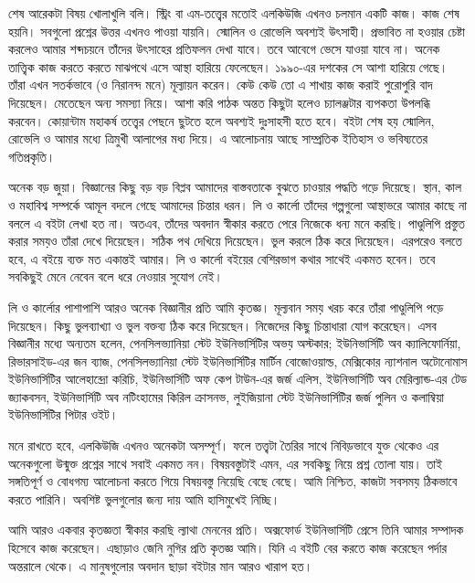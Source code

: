 \documentclass[
  letterpaper,
  DIV=11,
  numbers=noendperiod]{scrreprt}
\begin{document}
শেষ আরেকটা বিষয় খোলাখুলি বলি। স্ট্রিং বা এম-তত্ত্বের মতোই এলকিউজি এখনও চলমান
একটি কাজ। কাজ শেষ হয়নি। সবগুলো প্রশ্নের উত্তর এখনও পাওয়া যায়নি। স্মোলিন ও
রোভেলি অবশ্যই উৎসাহী। প্রভাবিত না হওয়ার চেষ্টা করলেও আমার শব্দচয়নে তাঁদের
উৎসাহের প্রতিফলন দেখা যাবে। তবে আবেগে ভেসে যাওয়া যাবে না। অনেক তাত্ত্বিক
কাজ করতে করতে মাঝপথে এসে আস্থা হারিয়ে ফেলেছেন। ১৯৯০-এর দশকের সে আশা
হারিয়ে গেছে। তাঁরা এখন সতর্কভাবে (ও নিরানন্দ মনে) মূল্যায়ন করেন। কেউ কেউ তো এ
শাখায় কাজ করাই পুরোপুরি বাদ দিয়েছেন। মেতেছেন অন্য সমস্যা নিয়ে। আশা করি পাঠক
অন্তত কিছুটা হলেও চ্যালঞ্জটার ব্যপকতা উপলব্ধি করবেন। কোয়ান্টাম মহাকর্ষ তত্ত্বের
পেছনে ছুটতে হলে অবশ্যই দুঃসাহসী হতে হবে। বইটা শেষ হয় স্মোলিন, রোভেলি ও আমার
মধ্যে ত্রিমুখী আলাপের মধ্য দিয়ে। এ আলোচনায় আছে সাম্প্রতিক ইতিহাস ও ভবিষ্যতের
গতিপ্রকৃতি।

অনেক বড় জুয়া। বিজ্ঞানের কিছু বড় বড় বিপ্লব আমাদের বাস্তবতাকে বুঝতে চাওয়ার পদ্ধতি
গড়ে দিয়েছে। স্থান, কাল ও মহাবিশ্ব সম্পর্কে আমূল বদলে গেছে আমাদের চিন্তার ধরন।
লি ও কার্লো তাঁদের গল্পগুলো আস্থাভরে আমার কাছে না বললে এ বইটা লেখা হত না।
অতএব, তাঁদের অবদান স্বীকার করতে পেরে নিজেকে ধন্য মনে করছি। পাণ্ডুলিপি প্রস্তুত
করার সময়ও তাঁরা দেখে দিয়েছেন। সঠিক পথ দেখিয়ে দিয়েছেন। ভুল করলে ঠিক করে
দিয়েছেন। এরপরেও বলতে হবে, এ বইয়ে ব্যক্ত মত একান্তই আমার। লি ও কার্লো বইয়ের
বেশিরভাগ কথার সাথেই একমত হবেন। তবে সবকিছুই মেনে নেবেন বলে ধরে নেওয়ার সুযোগ
নেই।

লি ও কার্লোর পাশাপাশি আরও অনেক বিজ্ঞানীর প্রতি আমি কৃতজ্ঞ। মূল্যবান সময় খরচ করে
তাঁরা পাণ্ডুলিপি পড়ে দিয়েছেন। কিছু ভুলব্যাখ্যা ও ভুল বক্তব্য ঠিক করে দিয়েছেন।
নিজেদের কিছু চিন্তাধারা যোগ করেছেন। এসব বিজ্ঞানীর মধ্যে অন্যতম হলেন,
পেনসিলভ্যানিয়া স্টেট ইউনিভার্সিটির অভয় অস্টকার; ইউনিভার্সিটি অব ক্যালিফোর্নিয়া,
রিভারসাইড-এর জন ব্যাজ, পেনসিলভ্যানিয়া স্টেট ইউনিভার্সিটির মার্টিন বোজোওয়াল্ড,
মেক্সিকোর ন্যাশনাল অটোনোমাস ইউনিভার্সিটির আলেহান্দ্রো করিচি, ইউনিভার্সিটি অফ
কেপ টাউন-এর জর্জ এলিস, ইউনিভার্সিটি অব মেরিল্যান্ড-এর টেড জ্যাকবসন,
ইউনিভার্সিটি অব নটিংহামের কিরিল ক্রাসনভ, লুইজিয়ানা স্টেট ইউনিভার্সিটির জর্জ
পুলিন ও কলাম্বিয়া ইউনিভার্সিটির পিটার ওইট।

মনে রাখতে হবে, এলকিউজি এখনও অনেকটা অসম্পূর্ণ। ফলে তত্ত্বটা তৈরির সাথে
নিবিড়ভাবে যুক্ত থেকেও এর অনেকগুলো উন্মুক্ত প্রশ্নের সাথে সবাই একমত নন।
বিষয়বস্তুটাই এমন, এর সবকিছু নিয়ে প্রশ্ন তোলা যায়। তাই সঙ্গতিপূর্ণ ও বোধগম্য
আলোচনা করতে গিয়ে বিষয়বস্তু নিয়েছি বেছে বেছে। আমি নিশ্চিত, কাজটা সবসময়
ঠিকভাবে করতে পারিনি। অবশিষ্ট ভুলগুলোর জন্য দায় আমি হাসিমুখেই নিচ্ছি।

আমি আরও একবার কৃতজ্ঞতা স্বীকার করছি ল্যাথা মেননের প্রতি। অক্সফোর্ড ইউনিভার্সিটি
প্রেসে তিনি আমার সম্পাদক হিসেবে কাজ করেছেন। এছাড়াও জেনি নুগির প্রতি কৃতজ্ঞ
আমি। যিনি এ বইটি বের করতে কাজ করেছেন পর্দার অন্তরালে থেকে। এ মানুষগুলোর
অবদান ছাড়া বইটার মান আরও খারাপ হত।
\end{document}
